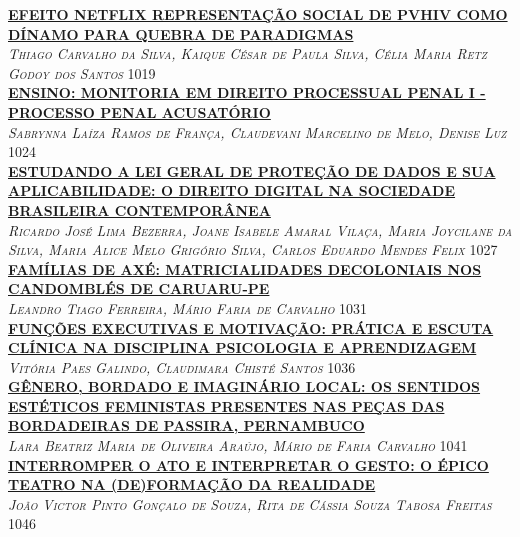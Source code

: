 \noindent \textsc{\hyperlink{trabalhos/250261.pdf.1}{\textbf{EFEITO NETFLIX REPRESENTAÇÃO SOCIAL DE PVHIV COMO DÍNAMO PARA QUEBRA DE PARADIGMAS}}}\\ 
\noindent \textsc{\textit{Thiago Carvalho da Silva, Kaique César de Paula Silva, Célia Maria Retz Godoy dos Santos}} \hfill 1019\\ 

\noindent \textsc{\hyperlink{trabalhos/250029.pdf.1}{\textbf{ENSINO: MONITORIA EM DIREITO PROCESSUAL PENAL I - PROCESSO PENAL ACUSATÓRIO}}}\\ 
\noindent \textsc{\textit{Sabrynna Laíza Ramos de França, Claudevani Marcelino de Melo, Denise Luz}} \hfill 1024\\ 

\noindent \textsc{\hyperlink{trabalhos/250133.pdf.1}{\textbf{ESTUDANDO A LEI GERAL DE PROTEÇÃO DE DADOS E SUA APLICABILIDADE: O DIREITO DIGITAL NA SOCIEDADE BRASILEIRA CONTEMPORÂNEA }}}\\ 
\noindent \textsc{\textit{Ricardo José Lima Bezerra, Joane Isabele Amaral Vilaça, Maria Joycilane da Silva, Maria Alice Melo Grigório Silva, Carlos Eduardo Mendes Felix}} \hfill 1027\\ 

\noindent \textsc{\hyperlink{trabalhos/250127.pdf.1}{\textbf{FAMÍLIAS DE AXÉ: MATRICIALIDADES DECOLONIAIS NOS CANDOMBLÉS DE CARUARU-PE}}}\\ 
\noindent \textsc{\textit{Leandro Tiago Ferreira, Mário Faria de Carvalho}} \hfill 1031\\ 

\noindent \textsc{\hyperlink{trabalhos/249756.pdf.1}{\textbf{FUNÇÕES EXECUTIVAS E MOTIVAÇÃO: PRÁTICA E ESCUTA CLÍNICA NA DISCIPLINA PSICOLOGIA E APRENDIZAGEM}}}\\ 
\noindent \textsc{\textit{Vitória Paes Galindo, Claudimara Chisté Santos}} \hfill 1036\\ 

\noindent \textsc{\hyperlink{trabalhos/249823.pdf.1}{\textbf{GÊNERO, BORDADO E IMAGINÁRIO LOCAL: OS SENTIDOS ESTÉTICOS FEMINISTAS PRESENTES NAS PEÇAS DAS BORDADEIRAS DE PASSIRA, PERNAMBUCO}}}\\ 
\noindent \textsc{\textit{Lara Beatriz Maria de Oliveira Araújo, Mário de Faria Carvalho}} \hfill 1041\\ 

\noindent \textsc{\hyperlink{trabalhos/249740.pdf.1}{\textbf{INTERROMPER O ATO E INTERPRETAR O GESTO: O ÉPICO TEATRO NA (DE)FORMAÇÃO DA REALIDADE}}}\\ 
\noindent \textsc{\textit{João Victor Pinto Gonçalo de Souza, Rita de Cássia Souza Tabosa Freitas}} \hfill 1046\\ 

